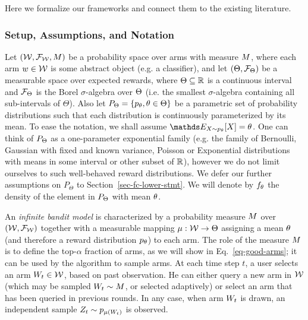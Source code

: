 Here we formalize our frameworks and connect them to the existing literature.



\subsubsection{Setup, Assumptions, and Notation}\label{setup}

Let $(\mathcal{W}, \mathcal{F}_{\mathcal{W}}, M)$ be a probability space over arms
with measure $M$,
where each arm $w \in \mathcal{W}$ is some abstract object (e.g. a classifier),
and let $(\Theta, \mathcal{F}_\Theta)$ be a measurable space over
expected rewards, where $\Theta \subseteq \mathbb{R}$ is a
continuous interval
and $\mathcal{F}_\Theta$ is the Borel $\sigma$-algebra over $\Theta$
(i.e. the smallest $\sigma$-algebra containing all sub-intervals of $\Theta$).
Also let
$P_{\ExpRewards} = \Set{ p_{\expReward}, \expReward \in \ExpRewards }$
be a parametric set of probability distributions such that each
distribution is continuously parameterized by its mean.
To ease the notation, we shall assume
$\ENone_{X \sim p_{\expReward}}[X] = \expReward$.
One can think of $P_{\Theta}$ as a one-parameter exponential family (e.g. the
family of Bernoulli, Gaussian with fixed and known variance, Poisson or Exponential distributions with means
in some interval or other subset of $\mathbb{R}$),
however we do not limit ourselves to such well-behaved reward distributions.
We defer our further assumptions on $P_\Theta$ to Section~\ref{sec-fc-lower-stmt}.
We will denote by $f_{\theta}$ the density of the element in $P_{\Theta}$
with mean $\theta$.

An \emph{infinite bandit model} is characterized by a probability measure
$M$ over $(\mathcal{W}, \mathcal{F}_{\mathcal{W}})$ together with a
measurable mapping $\mu : \mathcal{W} \rightarrow \Theta$
assigning a mean $\theta$
(and therefore a reward distribution $p_\theta$) to each arm.
The role of the measure $M$ is to define the top-$\alpha$ fraction of arms, as we will show in Eq.~\ref{eq-good-arms};
it can be used by the algorithm to sample arms.
At each time step $t$, a user
selects an arm $W_t \in \mathcal{W}$, based on past observation. He
can either query a new arm in $\mathcal{W}$
(which may be sampled $W_t \sim M$, or selected adaptively) or select an arm that
has been queried
in previous rounds. In any case, when arm $W_t$ is drawn, an independent sample
$Z_t \sim p_{\mu(W_t)}$ is observed. 

